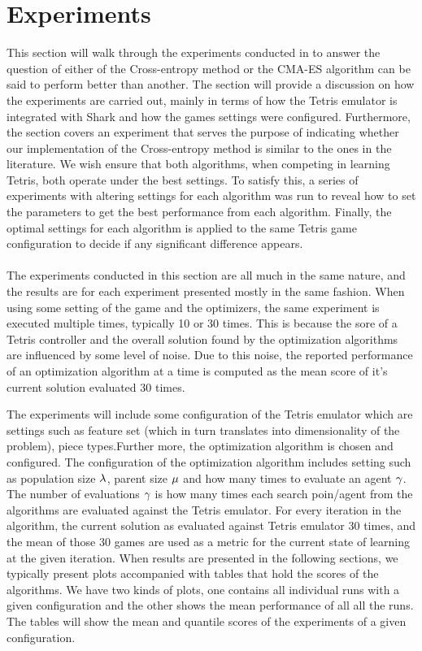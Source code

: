 \section{Experiments}


This section will walk through the experiments conducted in to answer the question 
of either of the Cross-entropy method or the CMA-ES algorithm can be said to perform better
than another. The section will provide a discussion on how the experiments are carried out, mainly
in terms of how the Tetris emulator is integrated with Shark and how the games settings were configured.
Furthermore, the section covers an experiment that serves the purpose of indicating whether our implementation
of the Cross-entropy method is similar to the ones in the literature. 
We wish ensure that both algorithms, when competing in learning Tetris, both operate under the 
best settings. To satisfy this, a series of experiments with altering settings for each 
algorithm was run to reveal how to set the parameters to get the best performance from 
each algorithm. Finally, the optimal settings for each algorithm is applied to
the same Tetris game configuration to decide if any significant difference appears.\\
\\
The experiments conducted in this section are all much in the same nature, and the 
results are for each experiment presented mostly in the same fashion. When using some setting 
of the game and the optimizers, the same experiment is executed multiple times, typically 
10 or 30 times. This is because the sore of a Tetris controller and the overall 
solution found by the optimization algorithms are influenced by some level of noise.
Due to this noise, the reported performance of an optimization algorithm at a time
is computed as the mean score of it's current solution evaluated 30 times.
\begin{changebar}
The experiments will include some configuration of the Tetris emulator which are settings
such as feature set (which in turn translates into dimensionality of the problem),
piece types.Further more, the optimization algorithm is chosen and configured. The
configuration of the optimization algorithm includes setting such as population size
$\lambda$, parent size $\mu$ and how many times
to evaluate an agent $\gamma$. The number of evaluations $\gamma$
is how many times each search poin/agent from the algorithms are evaluated against the 
Tetris emulator. For every iteration in the algorithm, the current solution as 
evaluated against Tetris emulator 30 times, and the mean of those 30 games are used as
a metric for the current state of learning at the given iteration. When results are presented 
in the following sections, we typically present plots accompanied with tables 
that hold the scores of the algorithms. We have two kinds of plots, one contains all
individual runs with a given configuration and the other shows the mean performance
of all all the runs. The tables will show the mean and quantile scores of the experiments
of a given configuration.\end{changebar}\\

